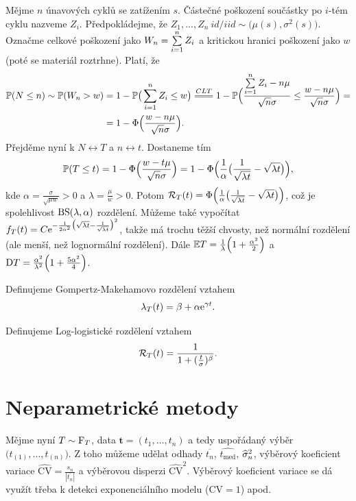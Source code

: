 \begin{define}
	 Mějme $n$ únavových cyklů se zatížením $s$. Částečné poškození součástky po $i$-tém cyklu nazveme $Z_i$. Předpokládejme, že $Z_1,...,Z_n~id/iid\sim \big(\mu(s),\sigma^2(s)\big)$. Označme celkové poškození jako $W_n=\sum\limits_{i=1}^{n} Z_i$ a kritickou hranici poškození jako $w$ (poté se materiál roztrhne). Platí, že 
	 \begin{align*}
	 \PP(N\leq n)\sim \PP(W_n>w)&=1-\PP\big(\sumin Z_i\leq 
	 w\big)\equal{CLT}1-\PP\Big(\frac{\sumin 
	 Z_i-n\mu}{\sqrt{n}\sigma}\leq 
	 \frac{w-n\mu}{\sqrt{n}\sigma}\Big)=\\&=1-\Phi\Big(\frac{w-n\mu}
	 {\sqrt{n}\sigma}\Big). 
	 \end{align*} 
	 Přejděme nyní k $N\leftrightarrow T$ a $n\leftrightarrow t$. Dostaneme tím 
	 $$ \mathbb{P}(T\leq 
	 t)=1-\Phi\Big(\frac{w-t\mu}{\sqrt{n}\sigma}\Big)=1-\Phi\Big(\frac{1}{\alpha}\big(\frac{1}{\sqrt{\lambda
	  t}}-\sqrt{\lambda t}\big)\Big), $$ kde 
	 $\alpha=\frac{\sigma}{\sqrt{\mu w}}>0$ a 
	 $\lambda=\frac{\mu}{w}>0$. Potom 
	 $\mathcal{R}_T(t)=\Phi\Big(\frac{1}{\alpha}\big(\frac{1}{\sqrt{\lambda 
	 t}}-\sqrt{\lambda t}\big)\Big)$, což je spolehlivost 
	 $\mathrm{BS}(\lambda,\alpha)$ rozdělení. Můžeme také vypočítat 
	 $f_T(t)=C\mathrm{e}^{-\frac{1}{2\alpha^2}\big(\sqrt{\lambda 
	 t}-\frac{1}{\sqrt{\lambda t}}\big)^2}$, takže má trochu těžší 
	 chvosty, než normální rozdělení (ale menší, než lognormální 
	 rozdělení). Dále $\mathbb{E} 
	 T=\frac{1}{\lambda}\Big(1+\frac{\alpha^2}{2}\Big)$ a $\mathrm{D} 
	 T=\frac{\alpha^2}{\lambda^2}\Big(1+\frac{5\alpha^2}{4}\Big)$.
\end{define}


\begin{define}
	Definujeme Gompertz-Makehamovo rozdělení vztahem 
	$$ \lambda_T(t)=\beta+\alpha \mathrm{e}^{\gamma t}. $$
\end{define}

\begin{define}
	Definujeme Log-logistické rozdělení vztahem 
	$$ \mathcal{R}_T(t)=\frac{1}{1+(\frac{t}{\sigma})^\beta}.$$

\end{define}

\section{Neparametrické metody}
Mějme nyní $T\sim\mathrm{F}_T$, data $\textbf{t}=(t_1,...,t_n)$ a tedy uspořádaný výběr $\big(t_{(1)},...,t_{(n)}\big)$. Z toho můžeme udělat odhady $\overline{t_n}$, $\widehat{t_\mathrm{med}}$, $\widehat{\sigma}_n^2$, výběrový koeficient variace $\widehat{\mathrm{CV}}=\frac{s_n}{|\overline{t_n}|}$ a výběrovou disperzi $\widehat{\mathrm{CV}}^2$. Výběrový koeficient variace se dá využít třeba k detekci exponenciálního modelu ($\mathrm{CV}=1$) apod.

